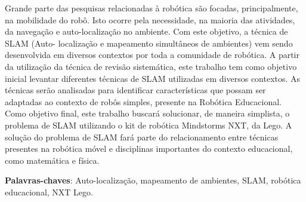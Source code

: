 \begin{resumo}
 
 	Grande parte das pesquisas relacionadas à robótica são focadas, principalmente, na mobilidade do robô. Isto ocorre pela necessidade, na maioria das atividades, da
navegação e auto-localização no ambiente. Com este objetivo, a técnica de SLAM (Auto-
localização e mapeamento simultâneos de ambientes) vem sendo desenvolvida em diversos
contextos por toda a comunidade de robótica. A partir da utilização da técnica
de revisão sistemática, este trabalho tem como objetivo inicial levantar diferentes técnicas
de SLAM utilizadas em diversos contextos. As técnicas serão analisadas para identificar características que possam ser adaptadas ao contexto de robôs simples, presente na Robótica Educacional. Como objetivo final, este trabalho buscará solucionar, de maneira simplista, o problema de SLAM utilizando o kit de robótica Mindstorms NXT, da Lego. A solução do problema de SLAM fará parte do relacionamento entre técnicas presentes na robótica móvel e disciplinas importantes do contexto educacional, como matemática e física.

 \vspace{\onelineskip}
    
 \noindent
 \textbf{Palavras-chaves}: Auto-localização, mapeamento de ambientes, SLAM, robótica educacional, NXT Lego.
\end{resumo}
